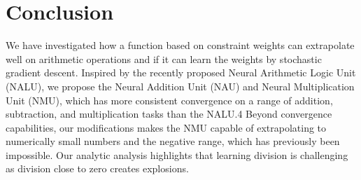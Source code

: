\section{Conclusion}
We have investigated how a function based on constraint weights can extrapolate well on arithmetic operations and if it can learn the weights by stochastic gradient descent.
Inspired by the recently proposed Neural Arithmetic Logic Unit (NALU), we propose the Neural Addition Unit (NAU) and Neural Multiplication Unit (NMU), which has more consistent convergence on a range of addition, subtraction, and multiplication tasks than the NALU.4
Beyond convergence capabilities, our modifications makes the NMU capable of extrapolating to numerically small numbers and the negative range, which has previously been impossible.
Our analytic analysis highlights that learning division is challenging as division close to zero creates explosions. 


